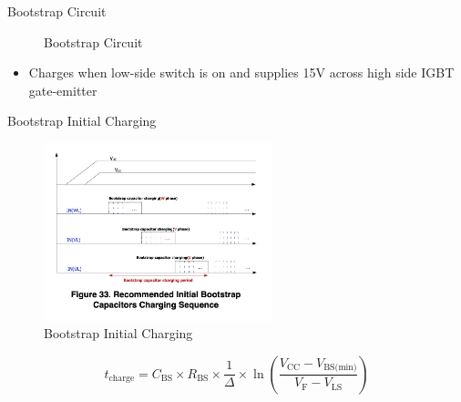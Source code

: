 \begin{frame}{Bootstrap Circuit}
	\begin{figure}
		\centering


		\caption{Bootstrap Circuit}
	\end{figure}

	\begin{itemize}
		\item Charges when low-side switch is on and supplies 15V across high side IGBT gate-emitter
	\end{itemize}
\end{frame}




\begin{frame}{Bootstrap Initial Charging}
	\begin{figure}
		\centering
		\includegraphics[width=2.6in]{sections/ppt/initalChargingGraph.jpg}
		\caption{Bootstrap Initial Charging}
	\end{figure}

	\begin{equation}
		t_\text{charge} = C_\text{BS} \times R_\text{BS} \times \frac{1}{\Delta} \times \ln\left(\frac{V_\text{CC} - V_\text{BS(min)}}{V_\text{F} - V_\text{LS}}\right)
	\end{equation}
\end{frame}

